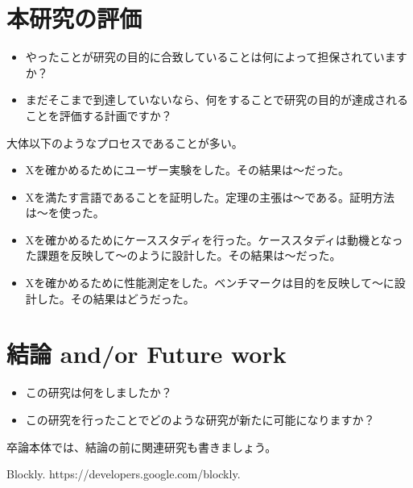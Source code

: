 \documentclass[11pt, a4paper, oneside, twocolumn]{jsarticle}
\begin{document}
\section{本研究の評価}
\begin{itemize}
\item やったことが研究の目的に合致していることは何によって担保されていますか？
\item まだそこまで到達していないなら、何をすることで研究の目的が達成されることを評価する計画ですか？
\end{itemize}
大体以下のようなプロセスであることが多い。
\begin{itemize}
\item Xを確かめるためにユーザー実験をした。その結果は〜だった。
\item Xを満たす言語であることを証明した。定理の主張は〜である。証明方法は〜を使った。
\item Xを確かめるためにケーススタディを行った。ケーススタディは動機となった課題を反映して〜のように設計した。その結果は〜だった。
\item Xを確かめるために性能測定をした。ベンチマークは目的を反映して〜に設計した。その結果はどうだった。
\end{itemize}

\section{結論 and/or Future work}
\begin{itemize}
\item この研究は何をしましたか？
\item この研究を行ったことでどのような研究が新たに可能になりますか？
\end{itemize}
卒論本体では、結論の前に関連研究も書きましょう。

{\scriptsize
\begin{thebibliography}{1} 
  Blockly. https://developers.google.com/blockly.
\end{thebibliography}
}
\end{document}

